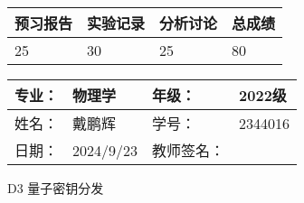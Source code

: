\documentclass[dvipsnames, svgnames,a4paper,11pt]{article}
\begin{document}
\begin{table}
	\renewcommand\arraystretch{1.7}
	\begin{tabularx}{\textwidth}{
		|X|X|X|X
		|X|X|X|X|}
	\hline
	\multicolumn{2}{|c|}{预习报告}&\multicolumn{2}{|c|}{实验记录}&\multicolumn{2}{|c|}{分析讨论}&\multicolumn{2}{|c|}{总成绩}\\
	\hline
	\LARGE25 & & \LARGE30 & & \LARGE25 & & \LARGE80 & \\
	\hline
	\end{tabularx}
\end{table}


\begin{table}
	\renewcommand\arraystretch{1.7}
	\begin{tabularx}{\textwidth}{|X|X|X|X|}
	\hline
	专业：& 物理学 &年级：& 2022级\\
	\hline
	姓名：& 戴鹏辉  & 学号： & 2344016 \\
	\hline
	日期：& 2024/9/23 & 教师签名：& \\
	\hline
	\end{tabularx}
\end{table}

\begin{center}
	\LARGE D3 \quad 量子密钥分发
\end{center}
\end{document}
